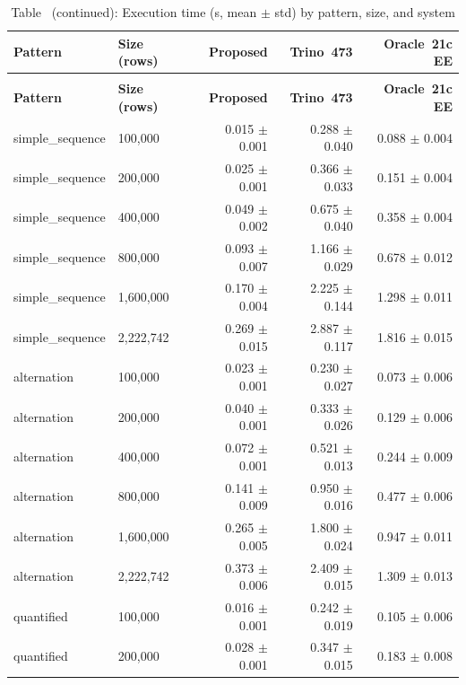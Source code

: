 {\scriptsize
\setlength{\tabcolsep}{3pt}
\begin{longtable}{>{\ttfamily}llrrr}
\caption{Execution time by pattern, size, and system
  (seconds; mean $\pm$ sample standard deviation)}
\label{tab:execution_times} \\
\toprule
\textbf{Pattern} & \textbf{Size (rows)} & \textbf{Proposed} & \textbf{Trino~473} & \textbf{Oracle~21c EE} \\
\midrule
\endfirsthead
\caption*{Table~\thetable{} (continued): Execution time (s, mean $\pm$ std) by pattern, size, and system} \\
\toprule
\textbf{Pattern} & \textbf{Size (rows)} & \textbf{Proposed} & \textbf{Trino~473} & \textbf{Oracle~21c EE} \\
\midrule
\endhead
\bottomrule
\endfoot
simple\_sequence & 100{,}000 & 0.015 $\pm$ 0.001 & 0.288 $\pm$ 0.040 & 0.088 $\pm$ 0.004 \\
simple\_sequence & 200{,}000 & 0.025 $\pm$ 0.001 & 0.366 $\pm$ 0.033 & 0.151 $\pm$ 0.004 \\
simple\_sequence & 400{,}000 & 0.049 $\pm$ 0.002 & 0.675 $\pm$ 0.040 & 0.358 $\pm$ 0.004 \\
simple\_sequence & 800{,}000 & 0.093 $\pm$ 0.007 & 1.166 $\pm$ 0.029 & 0.678 $\pm$ 0.012 \\
simple\_sequence & 1{,}600{,}000 & 0.170 $\pm$ 0.004 & 2.225 $\pm$ 0.144 & 1.298 $\pm$ 0.011 \\
simple\_sequence & 2{,}222{,}742 & 0.269 $\pm$ 0.015 & 2.887 $\pm$ 0.117 & 1.816 $\pm$ 0.015 \\
\midrule
alternation & 100{,}000 & 0.023 $\pm$ 0.001 & 0.230 $\pm$ 0.027 & 0.073 $\pm$ 0.006 \\
alternation & 200{,}000 & 0.040 $\pm$ 0.001 & 0.333 $\pm$ 0.026 & 0.129 $\pm$ 0.006 \\
alternation & 400{,}000 & 0.072 $\pm$ 0.001 & 0.521 $\pm$ 0.013 & 0.244 $\pm$ 0.009 \\
alternation & 800{,}000 & 0.141 $\pm$ 0.009 & 0.950 $\pm$ 0.016 & 0.477 $\pm$ 0.006 \\
alternation & 1{,}600{,}000 & 0.265 $\pm$ 0.005 & 1.800 $\pm$ 0.024 & 0.947 $\pm$ 0.011 \\
alternation & 2{,}222{,}742 & 0.373 $\pm$ 0.006 & 2.409 $\pm$ 0.015 & 1.309 $\pm$ 0.013 \\
\midrule
quantified & 100{,}000 & 0.016 $\pm$ 0.001 & 0.242 $\pm$ 0.019 & 0.105 $\pm$ 0.006 \\
quantified & 200{,}000 & 0.028 $\pm$ 0.001 & 0.347 $\pm$ 0.015 & 0.183 $\pm$ 0.008 \\

\end{longtable}}
